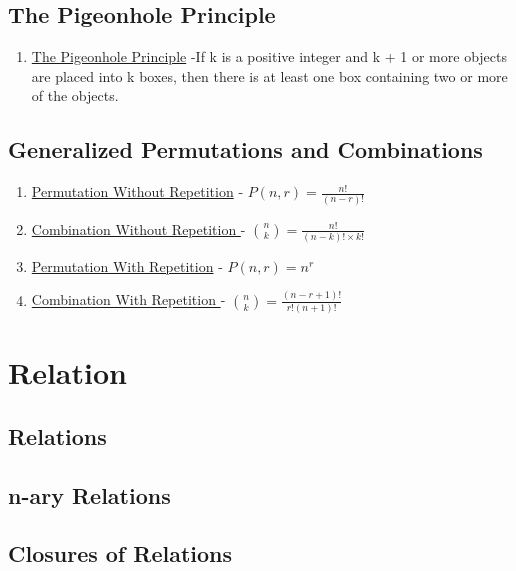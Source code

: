 \documentclass[12pt]{article}
\begin{document}
\subsection{The Pigeonhole Principle}
\begin{enumerate}
\item \underline{The Pigeonhole Principle} -If k is a positive integer and k + 1 or more objects are placed into k boxes, then there is at least one box containing two or more of the objects.
\end{enumerate}

\subsection{Generalized Permutations and Combinations}

\begin{enumerate}
\item \underline{Permutation Without Repetition} - $P( n, r ) = \frac{n!}{(n-r)!}$
\item \underline{Combination Without Repetition } - ${ n \choose k } = \frac{n!}{(n - k)! \times k!}$
\item \underline{Permutation With Repetition} - $P( n, r ) = n^{r}$
\item \underline{Combination With Repetition } - ${ n \choose k } = \frac{(n -r + 1)!}{r!(n + 1)!}$
\end{enumerate}

\section{Relation}
\subsection{Relations}
\subsection{n-ary Relations}
\subsection{Closures of Relations}
\end{document}
